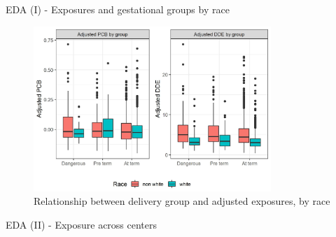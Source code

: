 \documentclass{beamer}\usepackage[]{graphicx}\usepackage[]{color}
\begin{document}
\begin{frame}{EDA (I) - Exposures and gestational groups by race}

\begin{figure}
  \centering
  \includegraphics[width=0.8\textwidth]{pcb_dde_per_gest.jpeg}
\caption{Relationship between delivery group and adjusted exposures, by race}
\label{fig:p1}
\end{figure}
\end{frame}

\begin{frame}{EDA (II) - Exposure across centers}
\end{frame}
\end{document}
